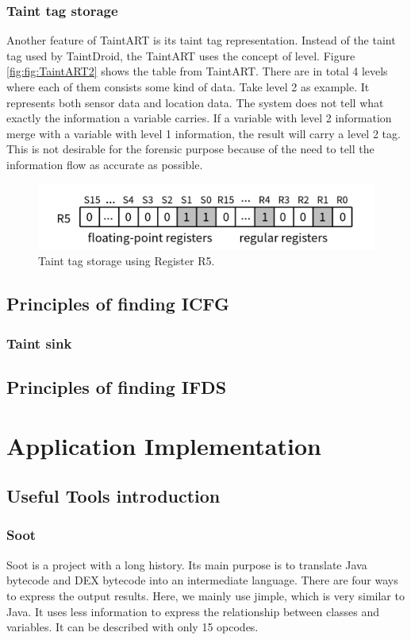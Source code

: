 \documentclass{article}
\begin{document}
\subsubsection{Taint tag storage}
Another feature of TaintART is its taint tag representation. Instead of the taint tag used by TaintDroid, the TaintART uses the concept of level. Figure \ref{fig:fig:TaintART2} shows the table from TaintART. There are in total 4 levels where each of them consists some kind of data. Take level 2 as example. It represents both sensor data and location data. The system does not tell what exactly the information a variable carries. If a variable with level 2 information merge with a variable with level 1 information, the result will carry a level 2 tag. This is not desirable for the forensic purpose because of the need to tell the information flow as accurate as possible.

\begin{figure}[ht]
  \centering
  \includegraphics[scale=0.4]{TaintART5.png}
  \caption{Taint tag storage using Register R5.}
  \label{fig:TaintART5}
\end{figure}


\subsection{Principles of finding ICFG}
\lipsum[5]
\subsubsection{Taint sink}

\subsection{Principles of finding IFDS}

\section{Application Implementation}
\subsection{Useful Tools introduction}
\subsubsection{Soot}
Soot is a project with a long history. Its main purpose is to translate Java bytecode and DEX bytecode into an intermediate language. There are four ways to express the output results. Here, we mainly use jimple, which is very similar to Java. It uses less information to express the relationship between classes and variables. It can be described with only 15 opcodes.
\end{document}
